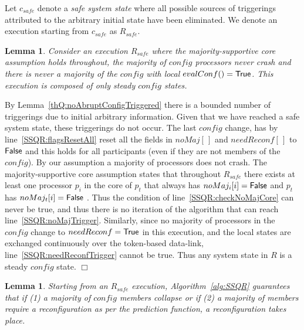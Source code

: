 \documentclass[11pt]{article}
\newtheorem{lemma}[theorem]{Lemma}
\newenvironment{proof}{\noindent{\bf Proof.}}{\hfill$\Box$}
\begin{document}
\vspace{.5em}
Let $c_{safe}$ denote a \emph{safe system state} where all possible sources of triggerings  attributed to the arbitrary initial state have been eliminated.
We denote an execution starting from $c_{safe}$ as $R_{safe}$.

\begin{lemma}
\label{thQ:steadyRemainsSteady}
Consider an execution $R_{safe}$ where the majority-supportive core assumption holds throughout, the majority of $config$ processors never crash and there is never a majority of the $config$ with local $evalConf() = \sf True$. 
This execution is composed of only steady $config$ states. 
\end{lemma}

\begin{proof}
By Lemma~\ref{thQ:noAbruptConfigTriggered} there is a bounded number of triggerings due to initial arbitrary information.
Given that we have reached a safe system state, these triggerings do not occur.
The last $config$ change, has by line~\ref{SSQR:flagsResetAll} reset all the fields in $noMaj[\,]$ and $needReconf[\,]$ to $\sf False$ and this holds for all participants (even if they are not members of the $config$).
By our assumption a majority of processors does not crash. 
The majority-supportive core assumption states that throughout $R_{safe}$ there exists at least one processor $p_i$ in the core of $p_t$ that always has $noMaj_i[i] = {\sf False}$ and $p_t$ has $noMaj_t[i] = {\sf False}$ .
Thus the condition of line~\ref{SSQR:checkNoMajCore} can never be true, and thus there is no iteration of the algorithm that can reach line~\ref{SSQR:noMajTrigger}.
Similarly, since no majority of processors in the $config$ change to $needReconf = {\sf True}$ in this execution, and the local states are exchanged continuously over the token-based data-link, line~\ref{SSQR:needReconfTrigger} cannot be true.
Thus any system state in $R$ is a steady $config$ state.
\end{proof}

\begin{lemma}
\label{thQ:triggeredWhenNeeded}
Starting from an $R_{safe}$ execution, Algorithm~\ref{alg:SSQR} guarantees that if (1) a majority of $config$ members collapse or if (2) a majority of members require a reconfiguration as per the prediction function, a reconfiguration takes place.
\end{lemma}
\end{document}
